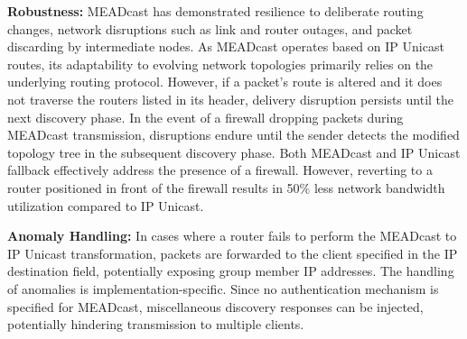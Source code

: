 \begin{itemize}
    \textbf{Robustness:}
    MEADcast has demonstrated resilience to deliberate routing changes, network
        disruptions such as link and router outages, and packet discarding by
        intermediate nodes.
    As MEADcast operates based on IP Unicast routes, its adaptability to
        evolving network topologies primarily relies on the underlying routing
        protocol.
    However, if a packet's route is altered and it does not traverse the
        routers listed in its header, delivery disruption persists until the
        next discovery phase.
    In the event of a firewall dropping packets during MEADcast transmission,
        disruptions endure until the sender detects the modified topology tree
        in the subsequent discovery phase.
    Both MEADcast and IP Unicast fallback effectively address the presence of
        a firewall.
    However, reverting to a router positioned in front of the firewall results
        in 50\% less network bandwidth utilization compared to IP Unicast.

    \textbf{Anomaly Handling:}
    In cases where a router fails to perform the MEADcast to IP Unicast
        transformation, packets are forwarded to the client specified in the IP
        destination field, potentially exposing group member IP addresses.
    The handling of anomalies is implementation-specific.
    Since no authentication mechanism is specified for MEADcast, miscellaneous
        discovery responses can be injected, potentially hindering transmission
        to multiple clients.


\end{itemize}
